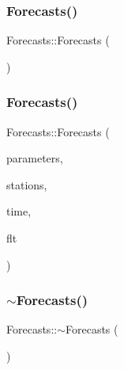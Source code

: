 \mbox{\label{class_forecasts_a6f47e34b9ae9bb9496149208e3246d65}} 
\subsubsection{\texorpdfstring{Forecasts()}{Forecasts()}\hspace{0.1cm}{\footnotesize\ttfamily [2/3]}}
{\footnotesize\ttfamily Forecasts\+::\+Forecasts (\begin{DoxyParamCaption}\item[{\mbox{\hyperlink{class_forecasts}{Forecasts}} const \&}]{ }\end{DoxyParamCaption})\hspace{0.3cm}{\ttfamily [delete]}}

\mbox{\label{class_forecasts_a9170f0dd3065f443e19b4280dc2bee2d}} 
\subsubsection{\texorpdfstring{Forecasts()}{Forecasts()}\hspace{0.1cm}{\footnotesize\ttfamily [3/3]}}
{\footnotesize\ttfamily Forecasts\+::\+Forecasts (\begin{DoxyParamCaption}\item[{\mbox{\hyperlink{classanen_par_1_1_parameters}{anen\+Par\+::\+Parameters}}}]{parameters,  }\item[{\mbox{\hyperlink{classanen_sta_1_1_stations}{anen\+Sta\+::\+Stations}}}]{stations,  }\item[{\mbox{\hyperlink{classanen_time_1_1_times}{anen\+Time\+::\+Times}}}]{time,  }\item[{\mbox{\hyperlink{classanen_time_1_1_f_l_ts}{anen\+Time\+::\+F\+L\+Ts}}}]{flt }\end{DoxyParamCaption})}

\mbox{\label{class_forecasts_a340fd19812d62efc334fe4d23ff8dcd2}} 
\subsubsection{\texorpdfstring{$\sim$\+Forecasts()}{~Forecasts()}}
{\footnotesize\ttfamily Forecasts\+::$\sim$\+Forecasts (\begin{DoxyParamCaption}{ }\end{DoxyParamCaption})\hspace{0.3cm}{\ttfamily [virtual]}}



